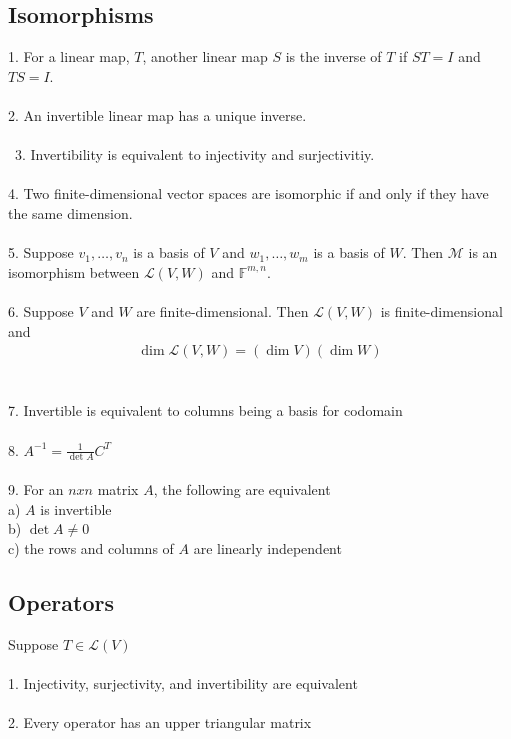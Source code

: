 \documentclass[11pt,reqno]{article}
\newcommand{\F}{\mathbb{F}}
\theoremstyle{definition}
\begin{document}
\subsection*{Isomorphisms}
1. For a linear map, $T$, another linear map $S$ is the inverse of $T$ if $ST = I$ and $TS = I$.\\\\
2. An invertible linear map has a unique inverse.\\\\\
3. Invertibility is equivalent to injectivity and surjectivitiy.\\\\
4. Two finite-dimensional vector spaces are isomorphic if and only if they have the same dimension.\\\\
5. Suppose $v_1,\ldots,v_n$ is a basis of $V$ and $w_1,\ldots,w_m$ is a basis of $W$. Then $\mathcal{M}$ is an isomorphism between $\mathcal{L}(V, W)$ and $\F^{m,n}$.\\\\
6. Suppose $V$ and $W$ are finite-dimensional. Then $\mathcal{L}(V, W)$ is finite-dimensional and 
\begin{align*}
    \dim \mathcal{L}(V, W) = (\dim V)(\dim W)
\end{align*}\\\\
7. Invertible is equivalent to columns being a basis for codomain\\\\
8. $A^{-1} = \frac{1}{\det A}C^T$\\\\
9. For an $nxn$ matrix $A$, the following are equivalent\\
\indent a) $A$ is invertible\\
\indent b) $\det A\neq 0$\\
\indent c) the rows and columns of $A$ are linearly independent

\subsection*{Operators}
Suppose $T\in\mathcal{L}(V)$\\\\
1. Injectivity, surjectivity, and invertibility are equivalent\\\\
2. Every operator has an upper triangular matrix
\end{document}
